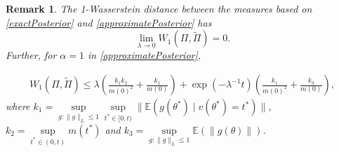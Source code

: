 \documentclass[10pt,fleqn]{article}
\newtheorem{remark}{Remark}
\newcommand{\mc}[1]{\mathcal{#1}}
\DeclareMathOperator{\1}{\mathbbm{1}}
\begin{document}


\begin{remark}
The 1-Wasserstein distance between the measures based on \eqref{exactPosterior} and \eqref{approximatePosterior} has
$$ \underset{\lambda \rightarrow 0}\lim W_1(\Pi,\tilde\Pi)=0.$$
Further, for $\alpha=1$ in \eqref{approximatePosterior},

\begin{equation}
\begin{aligned}
W_1(\Pi,\tilde\Pi) \le \lambda (\frac{k_1 k_2}{m(0)^2} + \frac{k_1}{m(0)}) + \exp(- \lambda^{-1} t )(\frac{k_1}{m(0)^2} + \frac{k_3}{m(0)}),
\end{aligned}
\end{equation}
where $k_1=\underset{g:\|g\|_L\le 1}\sup\underset{t^*\in [0,t)}\sup \|\mathbb{E}(g(\theta^*) \mid v(\theta^*)=t^*)\|$, $k_2= \underset{t^*\in (0,t)}\sup  m(t^{*})$ and $k_3=\underset{g:\|g\|_L\le 1} \sup \mathbb{E}(\| g(\theta )\|)$.
\end{remark}
\end{document}
